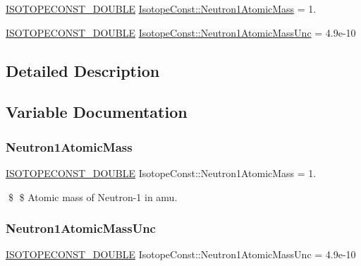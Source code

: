 \begin{DoxyCompactItemize}
\item 
\mbox{\hyperlink{group___isotope_const-_macros_ga8f45a7272ce02c0b4c65c44636ed719a}{I\+S\+O\+T\+O\+P\+E\+C\+O\+N\+S\+T\+\_\+\+D\+O\+U\+B\+LE}} \mbox{\hyperlink{group___isotope_const-_neutron-n1_ga867d18edbb8f11bd1d8824c80511feb9}{Isotope\+Const\+::\+Neutron1\+Atomic\+Mass}} = 1.
\item 
\mbox{\hyperlink{group___isotope_const-_macros_ga8f45a7272ce02c0b4c65c44636ed719a}{I\+S\+O\+T\+O\+P\+E\+C\+O\+N\+S\+T\+\_\+\+D\+O\+U\+B\+LE}} \mbox{\hyperlink{group___isotope_const-_neutron-n1_ga63f822972fec83b4d5431021f9f26856}{Isotope\+Const\+::\+Neutron1\+Atomic\+Mass\+Unc}} = 4.\+9e-\/10
\end{DoxyCompactItemize}


\subsection{Detailed Description}


\subsection{Variable Documentation}
\mbox{\label{group___isotope_const-_neutron-n1_ga867d18edbb8f11bd1d8824c80511feb9}} 
\subsubsection{\texorpdfstring{Neutron1\+Atomic\+Mass}{Neutron1AtomicMass}}
{\footnotesize\ttfamily \mbox{\hyperlink{group___isotope_const-_macros_ga8f45a7272ce02c0b4c65c44636ed719a}{I\+S\+O\+T\+O\+P\+E\+C\+O\+N\+S\+T\+\_\+\+D\+O\+U\+B\+LE}} Isotope\+Const\+::\+Neutron1\+Atomic\+Mass = 1.}

\$ \$ Atomic mass of Neutron-\/1 in amu. \mbox{\label{group___isotope_const-_neutron-n1_ga63f822972fec83b4d5431021f9f26856}} 
\subsubsection{\texorpdfstring{Neutron1\+Atomic\+Mass\+Unc}{Neutron1AtomicMassUnc}}
{\footnotesize\ttfamily \mbox{\hyperlink{group___isotope_const-_macros_ga8f45a7272ce02c0b4c65c44636ed719a}{I\+S\+O\+T\+O\+P\+E\+C\+O\+N\+S\+T\+\_\+\+D\+O\+U\+B\+LE}} Isotope\+Const\+::\+Neutron1\+Atomic\+Mass\+Unc = 4.\+9e-\/10}

